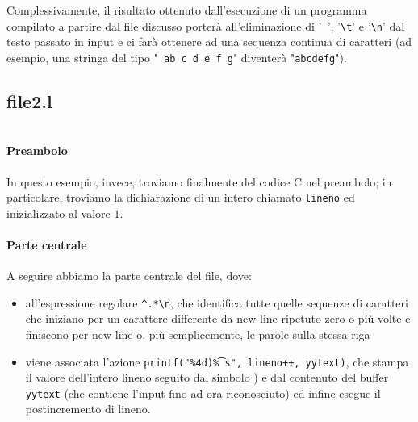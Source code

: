 \documentclass[class=book, crop=false, oneside, 12pt]{standalone}
\begin{document}
Complessivamente, il risultato ottenuto dall'esecuzione di un programma compilato a partire dal file discusso porterà all'eliminazione di '\texttt{ }', '\texttt{\textbackslash t}' e '\texttt{\textbackslash n}' dal testo passato in input e ci farà ottenere ad una sequenza continua di caratteri (ad esempio, una stringa del tipo "\texttt{ ab c d e \hspace{.8cm} f g}" diventerà "\texttt{abcdefg}").

\subsection*{file2.l}

\inputminted[linenos, breaklines, tabsize = 2]{c}{assets/code-fragments/file2.l}%

\paragraph{Preambolo}
In questo esempio, invece, troviamo finalmente del codice C nel preambolo; in particolare, troviamo la dichiarazione di un intero chiamato \texttt{lineno} ed inizializzato al valore \(1\). 

\paragraph{Parte centrale}
A seguire abbiamo la parte centrale del file, dove: 

\begin{itemize}
    \item all'espressione regolare \texttt{\^{}.*\textbackslash n}, che identifica tutte quelle sequenze di caratteri che iniziano per un carattere differente da new line ripetuto zero o più volte e finiscono per new line o, più semplicemente, le parole sulla stessa riga
    \item  viene associata l'azione \texttt{printf("\%4d)\t\%s", lineno++, yytext)}, che stampa il valore dell'intero lineno seguito dal simbolo ) e dal contenuto del buffer \texttt{yytext} (che contiene l'input fino ad ora riconosciuto) ed infine esegue il postincremento di lineno.
\end{itemize}
\end{document}
